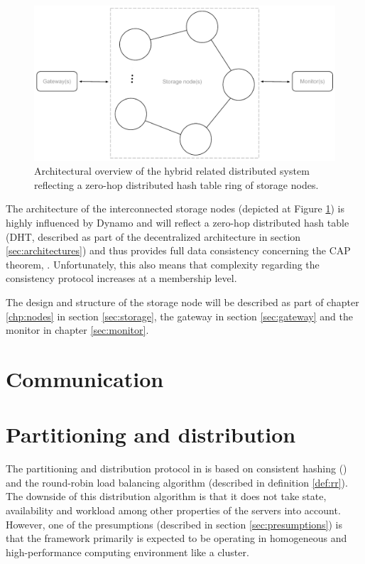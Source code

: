 \begin{figure}[h!]
	\centering
	\includegraphics[scale=0.7]{pdf/architecture-overview.pdf}
	\caption[Architectural overview]{Architectural overview of the hybrid related distributed system reflecting a zero-hop distributed hash table ring of storage nodes. \label{fig:architecture-overview}}
\end{figure}

The architecture of the interconnected storage nodes (depicted at Figure \ref{fig:architecture-overview}) is highly influenced by Dynamo and will reflect a zero-hop distributed hash table (DHT, described as part of the decentralized architecture in section \ref{sec:architectures}) and thus provides full data consistency concerning the CAP theorem, . Unfortunately, this also means that complexity regarding the consistency protocol increases at a membership level.
\newline

The design and structure of the storage node will be described as part of chapter \ref{chp:nodes} in section \ref{sec:storage}, the gateway in section \ref{sec:gateway} and the monitor in chapter \ref{sec:monitor}.

\section{Communication}


\section{Partitioning and distribution} \label{sec:pandd}
The partitioning and distribution protocol in \CodeName is based on consistent hashing () and the round-robin load balancing algorithm (described in definition \ref{def:rr}). The downside of this distribution algorithm is that it does not take state, availability and workload among other properties of the servers into account. However, one of the presumptions (described in section \ref{sec:presumptions}) is that the framework primarily is expected to be operating in homogeneous and high-performance computing environment like a cluster.
\vspace*{3mm}

